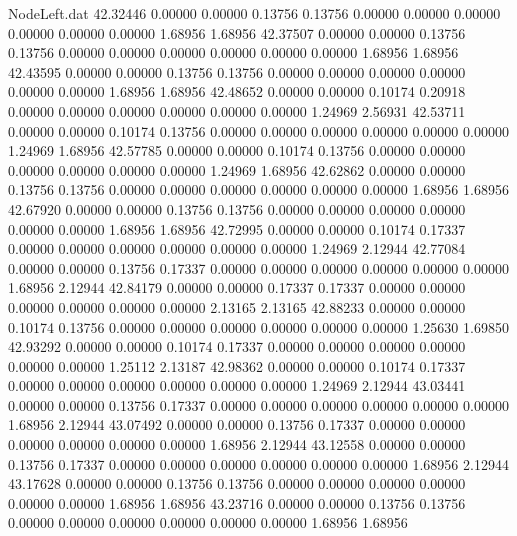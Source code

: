 \begin{filecontents}{NodeLeft.dat}
  42.32446    0.00000    0.00000     0.13756    0.13756    0.00000    0.00000    0.00000    0.00000    0.00000    0.00000    1.68956    1.68956
  42.37507    0.00000    0.00000     0.13756    0.13756    0.00000    0.00000    0.00000    0.00000    0.00000    0.00000    1.68956    1.68956
  42.43595    0.00000    0.00000     0.13756    0.13756    0.00000    0.00000    0.00000    0.00000    0.00000    0.00000    1.68956    1.68956
  42.48652    0.00000    0.00000     0.10174    0.20918    0.00000    0.00000    0.00000    0.00000    0.00000    0.00000    1.24969    2.56931
  42.53711    0.00000    0.00000     0.10174    0.13756    0.00000    0.00000    0.00000    0.00000    0.00000    0.00000    1.24969    1.68956
  42.57785    0.00000    0.00000     0.10174    0.13756    0.00000    0.00000    0.00000    0.00000    0.00000    0.00000    1.24969    1.68956
  42.62862    0.00000    0.00000     0.13756    0.13756    0.00000    0.00000    0.00000    0.00000    0.00000    0.00000    1.68956    1.68956
  42.67920    0.00000    0.00000     0.13756    0.13756    0.00000    0.00000    0.00000    0.00000    0.00000    0.00000    1.68956    1.68956
  42.72995    0.00000    0.00000     0.10174    0.17337    0.00000    0.00000    0.00000    0.00000    0.00000    0.00000    1.24969    2.12944
  42.77084    0.00000    0.00000     0.13756    0.17337    0.00000    0.00000    0.00000    0.00000    0.00000    0.00000    1.68956    2.12944
  42.84179    0.00000    0.00000     0.17337    0.17337    0.00000    0.00000    0.00000    0.00000    0.00000    0.00000    2.13165    2.13165
  42.88233    0.00000    0.00000     0.10174    0.13756    0.00000    0.00000    0.00000    0.00000    0.00000    0.00000    1.25630    1.69850
  42.93292    0.00000    0.00000     0.10174    0.17337    0.00000    0.00000    0.00000    0.00000    0.00000    0.00000    1.25112    2.13187
  42.98362    0.00000    0.00000     0.10174    0.17337    0.00000    0.00000    0.00000    0.00000    0.00000    0.00000    1.24969    2.12944
  43.03441    0.00000    0.00000     0.13756    0.17337    0.00000    0.00000    0.00000    0.00000    0.00000    0.00000    1.68956    2.12944
  43.07492    0.00000    0.00000     0.13756    0.17337    0.00000    0.00000    0.00000    0.00000    0.00000    0.00000    1.68956    2.12944
  43.12558    0.00000    0.00000     0.13756    0.17337    0.00000    0.00000    0.00000    0.00000    0.00000    0.00000    1.68956    2.12944
  43.17628    0.00000    0.00000     0.13756    0.13756    0.00000    0.00000    0.00000    0.00000    0.00000    0.00000    1.68956    1.68956
  43.23716    0.00000    0.00000     0.13756    0.13756    0.00000    0.00000    0.00000    0.00000    0.00000    0.00000    1.68956    1.68956

\end{filecontents}
